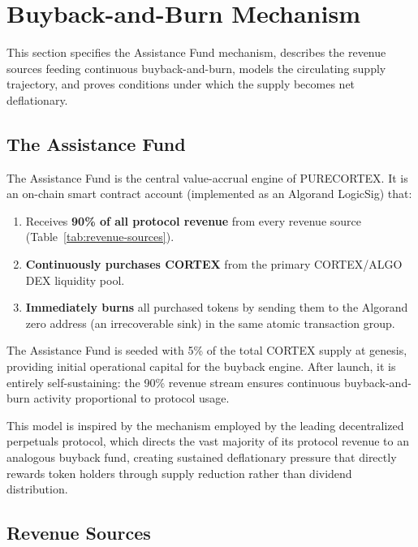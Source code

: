 \section{Buyback-and-Burn Mechanism}
\label{sec:buyback-burn}

This section specifies the Assistance Fund mechanism, describes the revenue
sources feeding continuous buyback-and-burn, models the circulating supply
trajectory, and proves conditions under which the supply becomes net
deflationary.

\subsection{The Assistance Fund}
\label{subsec:assistance-fund}

The Assistance Fund is the central value-accrual engine of PURECORTEX. It is
an on-chain smart contract account (implemented as an Algorand LogicSig) that:

\begin{enumerate}
  \item Receives \textbf{90\% of all protocol revenue} from every revenue
    source (Table~\ref{tab:revenue-sources}).
  \item \textbf{Continuously purchases CORTEX} from the primary CORTEX/ALGO
    DEX liquidity pool.
  \item \textbf{Immediately burns} all purchased tokens by sending them to the
    Algorand zero address (an irrecoverable sink) in the same atomic
    transaction group.
\end{enumerate}

The Assistance Fund is seeded with 5\% of the total CORTEX supply at genesis,
providing initial operational capital for the buyback engine. After launch, it
is entirely self-sustaining: the 90\% revenue stream ensures continuous
buyback-and-burn activity proportional to protocol usage.

This model is inspired by the mechanism employed by the leading decentralized
perpetuals protocol, which directs the vast majority of its protocol revenue to
an analogous buyback fund, creating sustained deflationary pressure that
directly rewards token holders through supply reduction rather than dividend
distribution.

\subsection{Revenue Sources}
\label{subsec:revenue-sources}

